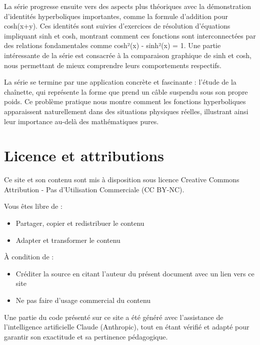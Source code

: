 \documentclass[
  12pt,
  letterpaper,
]{book}
\providecommand{\tightlist}{%
  \setlength{\itemsep}{0pt}\setlength{\parskip}{0pt}}\usepackage{longtable,booktabs,array}
\theoremstyle{remark}
\begin{document}
La série progresse ensuite vers des aspects plus théoriques avec la
démonstration d'identités hyperboliques importantes, comme la formule
d'addition pour cosh(x+y). Ces identités sont suivies d'exercices de
résolution d'équations impliquant sinh et cosh, montrant comment ces
fonctions sont interconnectées par des relations fondamentales comme
cosh²(x) - sinh²(x) = 1. Une partie intéressante de la série est
consacrée à la comparaison graphique de sinh et cosh, nous permettant de
mieux comprendre leurs comportements respectifs.

La série se termine par une application concrète et fascinante : l'étude
de la chaînette, qui représente la forme que prend un câble suspendu
sous son propre poids. Ce problème pratique nous montre comment les
fonctions hyperboliques apparaissent naturellement dans des situations
physiques réelles, illustrant ainsi leur importance au-delà des
mathématiques pures.

\hypertarget{licence-et-attributions}{%
\section*{Licence et attributions}\label{licence-et-attributions}}


Ce site et son contenu sont mis à disposition sous licence Creative
Commons Attribution - Pas d'Utilisation Commerciale (CC BY-NC).

\begin{tcolorbox}[enhanced jigsaw, opacityback=0, opacitybacktitle=0.6, left=2mm, rightrule=.15mm, bottomrule=.15mm, bottomtitle=1mm, titlerule=0mm, arc=.35mm, colback=white, leftrule=.75mm, title=\textcolor{quarto-callout-note-color}{\faInfo}\hspace{0.5em}{Droits d'utilisation}, colframe=quarto-callout-note-color-frame, colbacktitle=quarto-callout-note-color!10!white, toprule=.15mm, toptitle=1mm, breakable, coltitle=black]

Vous êtes libre de :

\begin{itemize}
\tightlist
\item
  Partager, copier et redistribuer le contenu
\item
  Adapter et transformer le contenu
\end{itemize}

À condition de :

\begin{itemize}
\tightlist
\item
  Créditer la source en citant l'auteur du présent document avec un lien
  vers ce site
\item
  Ne pas faire d'usage commercial du contenu
\end{itemize}

Une partie du code présenté sur ce site a été généré avec l'assistance
de l'intelligence artificielle Claude (Anthropic), tout en étant vérifié
et adapté pour garantir son exactitude et sa pertinence pédagogique.

\end{tcolorbox}
\end{document}
